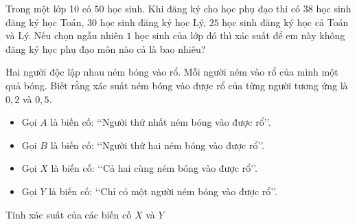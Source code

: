 \begin{bt}%
 
    Trong một lớp 10 có $50$ học sinh. Khi đăng ký cho học phụ đạo thi có $38$ học sinh đăng ký học Toán, $30$ học sinh đăng ký học Lý, $25$ học sinh đăng ký học cả Toán và Lý. Nếu chọn ngẫu nhiên $1$ học sinh của lớp đó thì xác suất để em này không đăng ký học phụ đạo môn nào cả là bao nhiêu?
\end{bt}

\begin{bt}%

	Hai người độc lập nhau ném bóng vào rổ. Mỗi người ném vào rổ của mình một quả bóng. Biết rằng xác suất ném bóng vào được rổ của từng người tương ứng là $0,2$ và $0,5$.
	\begin{itemize}
		\item Gọi $A$ là biến cố: \lq\lq Người thứ nhất ném bóng vào được rổ\rq\rq.
		\item Gọi $B$ là biến cố: \lq\lq Người thứ hai ném bóng vào được rổ\rq\rq.
		\item Gọi $X$ là biến cố: \lq\lq Cả hai cùng ném bóng vào được rổ\rq\rq.
		\item Gọi $Y$ là biến cố: \lq\lq Chỉ có một người ném bóng vào được rổ\rq\rq.
	\end{itemize}
	Tính xác suất của các biến cố $X$ và $Y$ 
\end{bt}

